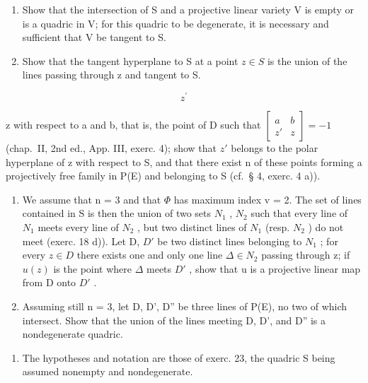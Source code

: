 \begin{enumerate}
\def\labelenumi{\alph{enumi})}
\item
  Show that the intersection of S and a projective linear variety V is empty or is a quadric in V; for this quadric to be degenerate, it is necessary and sufficient that V be tangent to S.
\item
  Show that the tangent hyperplane to S at a point \(z \in S\) is the union of the lines passing through z and tangent to S.
\end{enumerate}

\[
z ^ {\prime}
\]

z with respect to a and b, that is, the point of D such that \(\begin{bmatrix} a & b \\ z' & z \end{bmatrix} = -1\) (chap.~II, 2nd ed., App. III, exerc. 4); show that \(z'\) belongs to the polar hyperplane of z with respect to S, and that there exist n of these points forming a projectively free family in P(E) and belonging to S (cf.~§ 4, exerc. 4 a)).

\begin{enumerate}
\def\labelenumi{\alph{enumi})}
\setcounter{enumi}{3}
\item
  We assume that n = 3 and that \(\Phi\) has maximum index v = 2. The set of lines contained in S is then the union of two sets \(N_{1}\) , \(N_{2}\) such that every line of \(N_{1}\) meets every line of \(N_{2}\) , but two distinct lines of \(N_{1}\) (resp. \(N_{2}\) ) do not meet (exerc. 18 d)). Let D, \(D'\) be two distinct lines belonging to \(N_{1}\) ; for every \(z \in D\) there exists one and only one line \(\Delta \in N_{2}\) passing through z; if \(u(z)\) is the point where \(\Delta\) meets \(D'\) , show that u is a projective linear map from D onto \(D'\) .
\item
  Assuming still n = 3, let D, D', D'' be three lines of P(E), no two of which intersect. Show that the union of the lines meeting D, D', and D'' is a nondegenerate quadric.
\end{enumerate}

\begin{enumerate}
\def\labelenumi{\arabic{enumi})}
\setcounter{enumi}{23}
\tightlist
\item
  The hypotheses and notation are those of exerc. 23, the quadric S being assumed nonempty and nondegenerate.
\end{enumerate}

